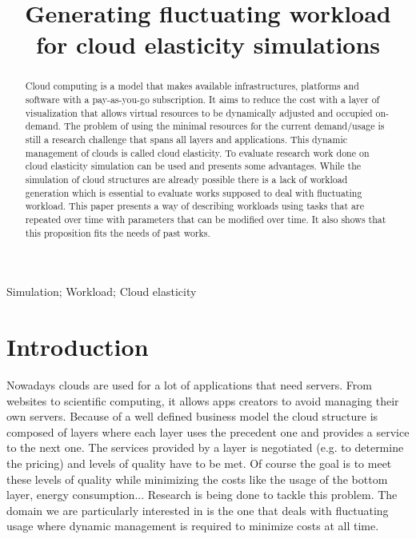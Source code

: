 \documentclass[a4paper]{IEEEtran}
\title{Generating fluctuating workload for cloud elasticity simulations}
\author{
	\IEEEauthorblockN{Simon Bihel}
	\IEEEauthorblockA{(Student) Computer Science Department, ENS Rennes\\
	\href{mailto:simon.bihel@ens-rennes.fr}{simon.bihel@ens-rennes.fr}}
}
\begin{document}
\maketitle

\begin{abstract}
  Cloud computing is a model that makes available infrastructures, platforms and
  software with a pay-as-you-go subscription. It aims to reduce the cost with a
  layer of visualization that allows virtual resources to be dynamically
  adjusted and occupied on-demand. The problem of using the minimal resources
  for the current demand/usage is still a research challenge that spans all
  layers and applications. This dynamic management of clouds is called cloud
  elasticity. To evaluate research work done on cloud elasticity simulation can 
  be used and presents some advantages. While the simulation of cloud 
  structures are already possible there is a lack of workload generation which 
  is essential to evaluate works supposed to deal with fluctuating workload. 
  This paper presents a way of describing workloads using tasks that are 
  repeated over time with parameters that can be modified over time. It also 
  shows that this proposition fits the needs of past works.
\end{abstract}

\begin{IEEEkeywords}
  Simulation;
  Workload;
  Cloud elasticity
\end{IEEEkeywords}

\section{Introduction} \label{intro}
  Nowadays clouds are used for a lot of applications that need servers. From 
  websites to scientific computing, it allows apps creators to avoid managing 
  their own servers. Because of a well defined business model the cloud 
  structure is composed of layers where each layer uses the precedent one and 
  provides a service to the next one. The services provided by a layer is 
  negotiated (e.g. to determine the pricing) and levels of quality have to be 
  met. Of course the goal is to meet these levels of quality while minimizing 
  the costs like the usage of the bottom layer, energy consumption... Research 
  is being done to tackle this problem. The domain we are particularly 
  interested in is the one that deals with fluctuating usage where dynamic 
  management is required to minimize costs at all time.
  
\end{document}
